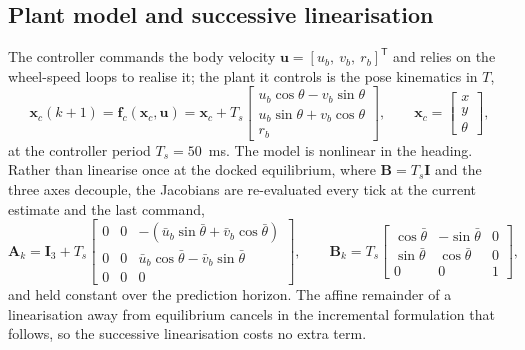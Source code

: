 \documentclass[11pt,a4paper]{article}
\newcommand{\vect}[1]{\bm{#1}}
\newcommand{\mat}[1]{\bm{#1}}
\newcommand{\T}{^{\mathsf{T}}}
\newcommand{\Ts}{T_s}
\begin{document}
\subsection{Plant model and successive linearisation}
The controller commands the body velocity $\vect u = [u_b,\ v_b,\ r_b]\T$ and relies on the wheel-speed loops to realise it; the plant it controls is the pose kinematics in $T$,
\begin{equation}
\vect x_c(k+1) = \vect f_c(\vect x_c,\vect u) = \vect x_c + \Ts\begin{bmatrix} u_b\cos\theta - v_b\sin\theta\\ u_b\sin\theta + v_b\cos\theta\\ r_b\end{bmatrix},\qquad \vect x_c = \begin{bmatrix}x\\ y\\ \theta\end{bmatrix},
\label{eq:mpc-fc}
\end{equation}
at the controller period $\Ts = 50$~ms. The model is nonlinear in the heading. Rather than linearise once at the docked equilibrium, where $\mat B = \Ts\mat I$ and the three axes decouple, the Jacobians are re-evaluated every tick at the current estimate and the last command,
\begin{equation}
\mat A_k = \mat I_3 + \Ts\begin{bmatrix}0&0&-(\bar u_b\sin\bar\theta + \bar v_b\cos\bar\theta)\\ 0&0&\bar u_b\cos\bar\theta - \bar v_b\sin\bar\theta\\ 0&0&0\end{bmatrix},\qquad
\mat B_k = \Ts\begin{bmatrix}\cos\bar\theta & -\sin\bar\theta & 0\\ \sin\bar\theta & \cos\bar\theta & 0\\ 0&0&1\end{bmatrix},
\label{eq:mpc-AB}
\end{equation}
and held constant over the prediction horizon. The affine remainder of a linearisation away from equilibrium cancels in the incremental formulation that follows, so the successive linearisation costs no extra term.
\end{document}
